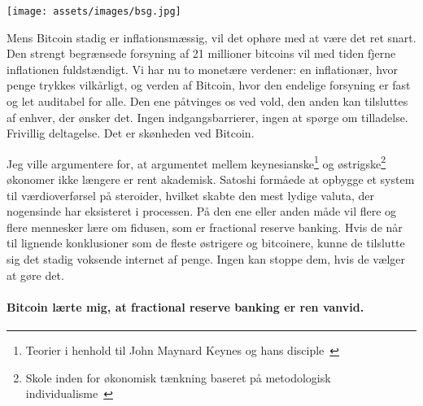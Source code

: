 \begin{center}
  \centering
  \texttt{[image: assets/images/bsg.jpg]}
  \label{fig:bsg}
\end{center}

Mens Bitcoin stadig er inflationsmæssig, vil det ophøre med at være det ret 
snart. Den strengt begrænsede forsyning af 21 millioner bitcoins vil med 
tiden fjerne inflationen fuldstændigt. Vi har nu to monetære verdener: en
inflationær, hvor penge trykkes vilkårligt, og verden af
Bitcoin, hvor den endelige forsyning er fast og let auditabel for alle.
Den ene påtvinges os ved vold, den anden kan tilsluttes af enhver, der ønsker
det. Ingen indgangsbarrierer, ingen at spørge om tilladelse.
Frivillig deltagelse. Det er skønheden ved Bitcoin.

Jeg ville argumentere for, at argumentet mellem keynesianske\footnote{Teorier i
henhold til John Maynard Keynes og hans disciple~\cite{wiki:keynesian}} og
østrigske\footnote{Skole inden for økonomisk tænkning baseret på metodologisk
individualisme~\cite{wiki:austrian}} økonomer ikke længere er rent akademisk.
Satoshi formåede at opbygge et system til værdioverførsel på steroider, hvilket 
skabte den mest lydige valuta, der nogensinde har eksisteret i processen. På 
den ene eller anden måde vil flere og flere mennesker lære om fidusen, som er 
fractional reserve banking. Hvis de når til lignende konklusioner som de fleste 
østrigere og bitcoinere, kunne de tilslutte sig det stadig voksende internet af 
penge. Ingen kan stoppe dem, hvis de vælger at gøre det.

\paragraph{Bitcoin lærte mig, at fractional reserve banking er ren vanvid.}

%
%
%
%
%
